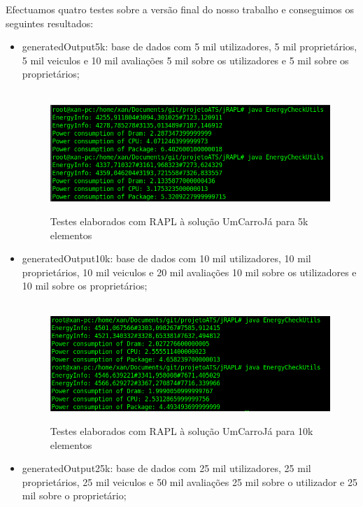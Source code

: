 Efectuamos quatro testes sobre a versão final do nosso trabalho e conseguimos os seguintes resultados:
\newpage
\begin{itemize}
    \item generatedOutput5k: base de dados com 5 mil utilizadores, 5 mil proprietários, 5 mil veiculos e 10 mil avaliações 5 mil sobre os utilizadores e 5 mil sobre os proprietários;
    
        \begin{figure}[H]
            \hbox{\hspace{-8em} \includegraphics[width=1.5\textwidth]{images/rapl_5k.png}}
            \label{fig52}
            \caption{Testes elaborados com RAPL à solução UmCarroJá para 5k elementos}
        \end{figure}
   
    \item generatedOutput10k: base de dados com 10 mil utilizadores, 10 mil proprietários, 10 mil veiculos e 20 mil avaliações 10 mil sobre os utilizadores e 10 mil sobre os proprietários;
    
        \begin{figure}[H]
            \hbox{\hspace{-8em} \includegraphics[width=1.5\textwidth]{images/rapl_10k.png}}
            \label{fig53}
            \caption{Testes elaborados com RAPL à solução UmCarroJá para 10k elementos}
        \end{figure}
        
    \item generatedOutput25k: base de dados com 25 mil utilizadores, 25 mil proprietários, 25 mil veiculos e 50 mil avaliações 25 mil sobre o utilizador e 25 mil sobre o proprietário;
    

\end{itemize}

